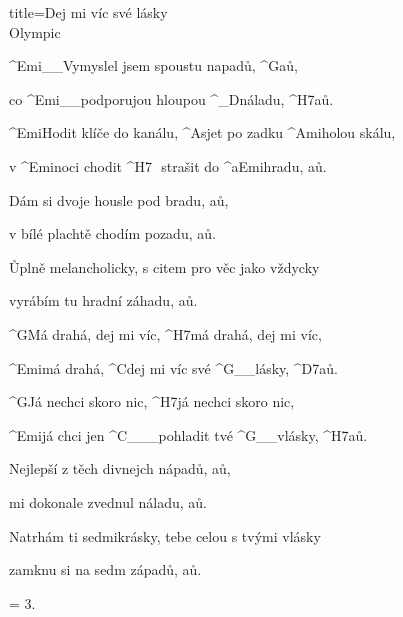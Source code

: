 \begin{song}{title=\predtitle\centering Dej mi víc své lásky \\\large Olympic  \vspace*{-0.3cm}}  %
\begin{centerjustified}
\nejnejvetsi

\sloka
	^{Emi{\color{white}\_\_}}Vymyslel jsem spoustu napadů, ^{G}aů,
   
	co ^{Emi{\color{white}\_\_}}podporujou hloupou ^{{\color{white}\_}D}náladu, ^{H7}aů.

	^{Emi}Hodit klíče do kanálu, ^{A}sjet po zadku ^{Ami}holou skálu,

	v ^{Emi}noci chodit ^{H7\,\,\,\,}strašit do ^{{\color{white}a}Emi}hradu, aů.

\sloka
	Dám si dvoje housle pod bradu, aů,

	v bílé plachtě chodím pozadu, aů.
	
	Ůplně melancholicky, s citem pro věc jako vždycky

	vyrábím tu hradní záhadu, aů.

	^{G}Má drahá, dej mi víc, ^{H7}má drahá, dej mi víc,

	^{Emi}má drahá, ^{C}dej mi víc své ^{G{\color{white}\_\_}}lásky, ^{D7}aů.

	^{G}Já nechci skoro nic, ^{H7}já nechci skoro nic,

	^{Emi}já chci jen ^{C{\color{white}\_\_\_}}pohladit tvé ^{G{\color{white}\_\_}}vlásky, ^{H7}aů.

\sloka
	Nejlepší z těch divnejch nápadů, aů,
	
	mi dokonale zvednul náladu, aů.

	Natrhám ti sedmikrásky, tebe celou s tvými vlásky

	zamknu si na sedm západů, aů.


\sloka = 3.

\end{centerjustified}

\centering
{}

\setcounter{Slokočet}{0}
\end{song}
